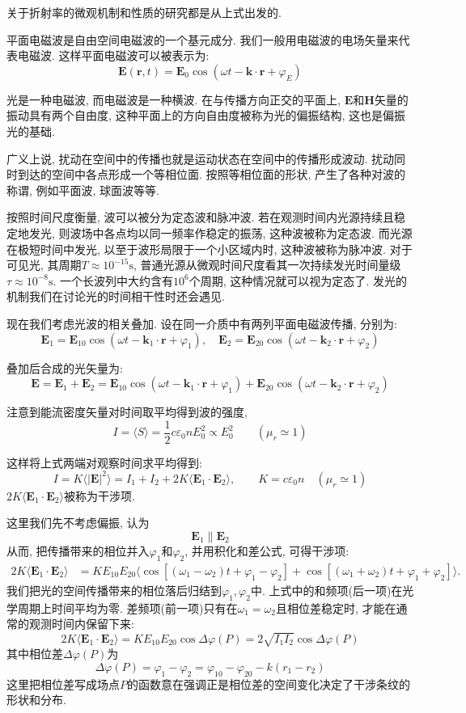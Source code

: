 关于折射率的微观机制和性质的研究都是从上式出发的.

平面电磁波是自由空间电磁波的一个基元成分. 我们一般用电磁波的电场矢量来代表电磁波. 这样平面电磁波可以被表示为:
\[
\bm{E}(\bm{r}, t) = \bm{E}_0 \cos (\omega t - \bm{k} \cdot \bm{r}+\varphi_E)
\]

光是一种电磁波, 而电磁波是一种横波. 在与传播方向正交的平面上, $\bm{E}$和$\bm{H}$矢量的振动具有两个自由度, 这种平面上的方向自由度被称为光的偏振结构, 这也是偏振光的基础.

广义上说, 扰动在空间中的传播也就是运动状态在空间中的传播形成波动. 扰动同时到达的空间中各点形成一个等相位面. 按照等相位面的形状, 产生了各种对波的称谓, 例如平面波, 球面波等等.

按照时间尺度衡量, 波可以被分为定态波和脉冲波. 若在观测时间内光源持续且稳定地发光, 则波场中各点均以同一频率作稳定的振荡, 这种波被称为定态波. 而光源在极短时间中发光, 以至于波形局限于一个小区域内时, 这种波被称为脉冲波. 对于可见光, 其周期$T\approx 10^{-15}\mathrm{s}$, 普通光源从微观时间尺度看其一次持续发光时间量级$\tau\approx10^{-8} \mathrm{s}$. 一个长波列中大约含有$10^6$个周期, 这种情况就可以视为定态了. 发光的机制我们在讨论光的时间相干性时还会遇见.

现在我们考虑光波的相关叠加. 设在同一介质中有两列平面电磁波传播, 分别为:
\[
\bm E_1 = \bm{E}_{10} \cos (\omega t - \bm{k}_1 \cdot \bm{r} + \varphi_1), \quad
\bm E_2 = \bm{E}_{20} \cos (\omega t - \bm{k}_2 \cdot \bm{r} + \varphi_2)
\]

叠加后合成的光矢量为:
\[
\bm E = \bm E_1 + \bm E_2 = \bm{E}_{10} \cos (\omega t - \bm{k}_1 \cdot \bm{r} + \varphi_1) + \bm{E}_{20} \cos (\omega t - \bm{k}_2 \cdot \bm{r} + \varphi_2)
\]

注意到能流密度矢量对时间取平均得到波的强度,
\[
I = \langle S \rangle = \frac{1}{2} c \varepsilon_0 n E_0^2 \propto E_0^2\qquad(\mu_r\simeq1)
\]

这样将上式两端对观察时间求平均得到:
\[
I = K\langle |\bm E|^2\rangle = I_1+I_2+2K\langle\bm E_1\cdot\bm E_2\rangle,\qquad K=c\varepsilon_0n\quad(\mu_r\simeq1)
\]
$2K\langle\bm E_1\cdot\bm E_2\rangle$被称为干涉项.

这里我们先不考虑偏振, 认为
\[
\bm{E}_1 \parallel \bm{E}_2
\]
从而, 把传播带来的相位并入$\varphi_1$和$\varphi_2$, 并用积化和差公式, 可得干涉项:
\[
\begin{aligned}
2K\langle\bm E_1\cdot\bm E_2\rangle
&=K E_{10}E_{20}\bigl\langle
\cos[(\omega_1-\omega_2)t+\varphi_1-\varphi_2]
+\cos[(\omega_1+\omega_2)t+\varphi_1+\varphi_2]
\bigr\rangle.
\end{aligned}
\]
我们把光的空间传播带来的相位落后归结到$\varphi_1, \varphi_2$中. 上式中的和频项(后一项)在光学周期上时间平均为零. 差频项(前一项)只有在$\omega_1=\omega_2$且相位差稳定时, 才能在通常的观测时间内保留下来:
\[
2K\langle \bm E_1\cdot\bm E_2\rangle=K E_{10}E_{20}\cos\Delta\varphi(P)=2\sqrt{I_1I_2}\cos\Delta\varphi(P)
\]
其中相位差$\Delta \varphi(P)$为
\[
\Delta \varphi(P) = \varphi_1 - \varphi_2 = \varphi_{10} - \varphi_{20}-k(r_1-r_2)
\]
这里把相位差写成场点$P$的函数意在强调正是相位差的空间变化决定了干涉条纹的形状和分布.

